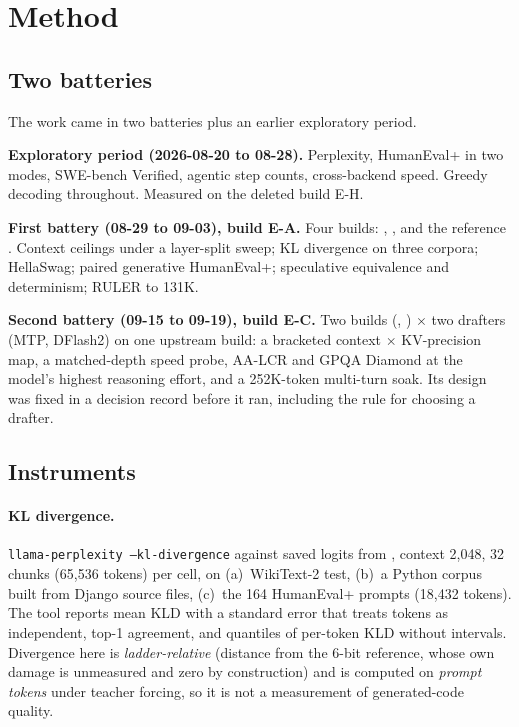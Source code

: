 \section{Method}\label{sec:method}

\subsection{Two batteries}
The work came in two batteries plus an earlier exploratory period.

\textbf{Exploratory period\hist{} (2026-08-20 to 08-28).} Perplexity, HumanEval+ in two modes,
SWE-bench Verified, agentic step counts, cross-backend speed. Greedy decoding throughout. Measured on
the deleted build E-H.

\textbf{First battery (08-29 to 09-03), build E-A.} Four builds: \Qfour, \Qfive, \Qsix{} and the
reference \QsixXL. Context ceilings under a layer-split sweep; KL divergence on three corpora;
HellaSwag; paired generative HumanEval+; speculative equivalence and determinism; RULER to 131K.

\textbf{Second battery (09-15 to 09-19), build E-C.} Two builds (\Qfour, \Qsix) $\times$ two drafters
(MTP, DFlash2) on one upstream build: a bracketed context $\times$ KV-precision map, a matched-depth
speed probe, AA-LCR and GPQA Diamond at the model's highest reasoning effort, and a 252K-token
multi-turn soak. Its design was fixed in a decision record before it ran, including the rule for
choosing a drafter.

\subsection{Instruments}
\paragraph{KL divergence.} \texttt{llama-perplexity --kl-divergence} against saved logits from \QsixXL,
context 2{,}048, 32 chunks (65{,}536 tokens) per cell, on (a)~WikiText-2 test, (b)~a Python corpus
built from Django source files, (c)~the 164 HumanEval+ prompts (18{,}432 tokens). The tool reports mean
KLD with a standard error that treats tokens as independent, top-1 agreement, and quantiles of per-token
KLD without intervals. Divergence here is \emph{ladder-relative} (distance from the 6-bit reference,
whose own damage is unmeasured and zero by construction) and is computed on \emph{prompt tokens} under
teacher forcing, so it is not a measurement of generated-code quality.

